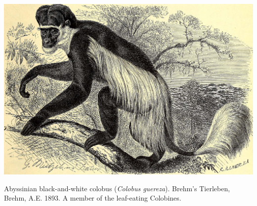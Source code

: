 \begin{marginfigure}
\begin{center}
\includegraphics[width=0.8 \textwidth]{illustration_images/Genetic_drift/Colobus/19792029373_fcce706e67_k.jpg}
\end{center}
\caption{Abyssinian black-and-white colobus ({\it Colobus guereza}). Brehm's Tierleben,  Brehm,
  A.E. 1893. A member of the leaf-eating Colobines.} \label{fig:Colobus}  
\end{marginfigure} 


